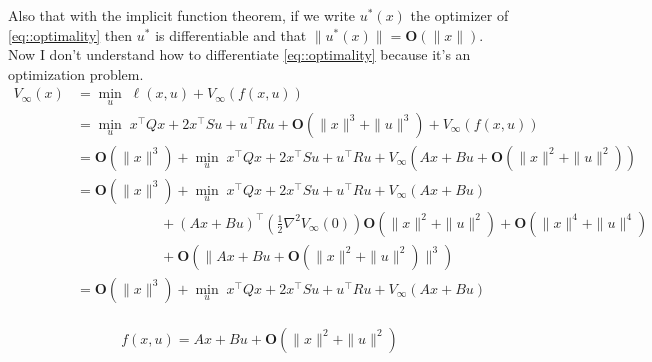 \documentclass[12pt]{article}
\numberwithin{theorem}{section} %
\theoremstyle{definition}
\theoremstyle{remark}
\begin{document}
\begin{enumerate}
	Also that with the implicit function theorem, if we write $u^*(x)$ the optimizer of \ref{eq::optimality} then $u^*$ is differentiable and that $\|u^*(x)\|=\mathbf{O}(\|x\|)$.
	Now I don't understand how to differentiate \ref{eq::optimality} because it's an optimization problem.
	\begin{align*}
		V_\infty(x) &= \min_u\;\ell(x,u)+V_\infty(f(x,u))\\
		&=\min_u\; x^\top Q x + 2 x^\top S u + u^\top R u +\mathbf{O}(\|x\|^3+\|u\|^3)+ V_\infty(f(x,u))\\
		&=\mathbf{O}(\|x\|^3)+\min_u\; x^\top Q x + 2 x^\top S u + u^\top R u + V_\infty(Ax+Bu+\mathbf{O}(\|x\|^2+\|u\|^2))\\
		&=\mathbf{O}(\|x\|^3)+\min_u\; x^\top Q x + 2 x^\top S u + u^\top R u + V_\infty(Ax+Bu)\\
		&\quad\quad\quad\quad\quad\quad+(Ax+Bu)^\top\left(\frac{1}{2}\nabla^2V_\infty(0)\right)\mathbf{O}(\|x\|^2+\|u\|^2)+\mathbf{O}(\|x\|^4+\|u\|^4)\\
		&\quad\quad\quad\quad\quad\quad+\mathbf{O}(\|Ax+Bu+\mathbf{O}(\|x\|^2+\|u\|^2)\|^3)\\
		&=\mathbf{O}(\|x\|^3)+\min_u\; x^\top Q x + 2 x^\top S u + u^\top R u + V_\infty(Ax+Bu)\\
	\end{align*}
	
	
	$$f(x,u)=Ax+Bu+\mathbf{O}(\|x\|^2+\|u\|^2)$$


\end{enumerate}
\end{document}
